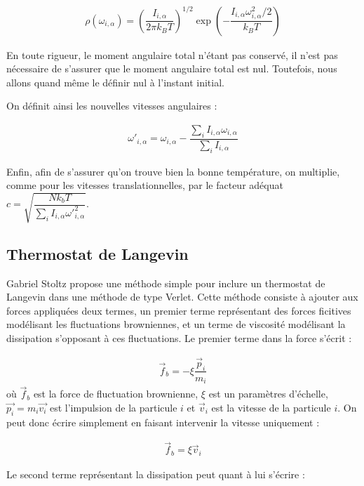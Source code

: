 \documentclass[12pt]{article}
\begin{document}
\begin{eqnarray} \label{eqn:gaussdistrot}
\rho\left(\omega_{i,\alpha}\right)=\left(\dfrac{I_{i,\alpha}}{2\pi k_B T}\right)^{1/2}\exp\left(-\dfrac{I_{i,\alpha} \omega_{i,\alpha}^2/2}{k_B T}\right)
\end{eqnarray}

En toute rigueur, le moment angulaire total n'étant pas conservé, il n'est pas nécessaire de s'assurer que le moment angulaire total est nul. Toutefois, nous allons quand même le définir nul à l'instant initial.

On définit ainsi les nouvelles vitesses angulaires :

\begin{eqnarray}
{\omega '}_{i,\alpha}=\omega_{i,\alpha}-\dfrac{\sum_i I_{i,\alpha}\omega_{i,\alpha}}{\sum_i I_{i,\alpha}}
\end{eqnarray}

Enfin, afin de s'assurer qu'on trouve bien la bonne température, on multiplie, comme pour les vitesses translationnelles, par le facteur adéquat $c=\sqrt{\dfrac{Nk_bT}{\sum_i I_{i,\alpha}{\omega '}_{i,\alpha}^2}}$.

\subsection{Thermostat de Langevin}

Gabriel Stoltz propose une méthode simple pour inclure un thermostat de Langevin dans une méthode de type Verlet. Cette méthode consiste à ajouter aux forces appliquées deux termes, un premier terme représentant des forces ficitives modélisant les fluctuations browniennes, et un terme de viscosité modélisant la dissipation s'opposant à ces fluctuations. Le premier terme dans la force s'écrit :

\begin{eqnarray}
\vec{f}_b=-\xi\dfrac{\vec{p}_i}{m_i}
\end{eqnarray}
où $\vec{f}_b$ est la force de fluctuation brownienne, $\xi$ est un paramètres d'échelle, $\vec{p_i}=m_i\vec{v_i}$ est l'impulsion de la particule $i$ et $\vec{v}_i$ est la vitesse de la particule $i$. On peut donc écrire simplement en faisant intervenir la vitesse uniquement :

\begin{eqnarray}
\vec{f}_b=\xi \vec{v}_i
\end{eqnarray}

Le second terme représentant la dissipation peut quant à lui s'écrire :
\end{document}
